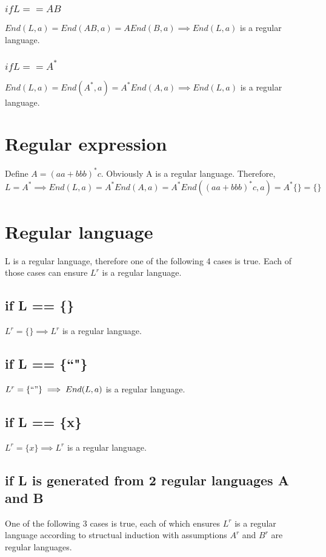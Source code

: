\documentclass{article}
\begin{document}
\subsubsection{$if L == A B$}
$End(L, a) = End(A B, a) = A End(B, a) \implies End(L, a)$ is a regular
language.

\subsubsection{$if L == A^*$}
$End(L, a) = End(A^*, a) = A^* End(A, a) \implies End(L, a)$ is a regular
language.

\section{Regular expression}
Define $A = (aa + bbb)^* c$. Obviously A is a regular language. Therefore,
\[L = A^* \implies End(L, a)
= A^* End(A, a)
= A^* End((aa + bbb)^* c, a)
= A^*\{\} = \{\}
\]

\section{Regular language}
L is a regular language, therefore one of the following 4 cases is true. Each of
those cases can ensure $L^r$ is a regular language.

\subsection{if L == \{\}}
$L^r = \{\} \implies L^r$ is a regular language.

\subsection{if L == \{``"\}}
$L^r = \{``"\} \implies End(L, a)$ is a regular language.

\subsection{if L == \{x\}}
$L^r = \{x\} \implies L^r$ is a regular language.

\subsection{if L is generated from 2 regular languages A and B}
One of the following 3 cases is true, each of which ensures $L^r$ is a
regular language according to structual induction with assumptions $A^r$ and
$B^r$ are regular languages.
\end{document}
